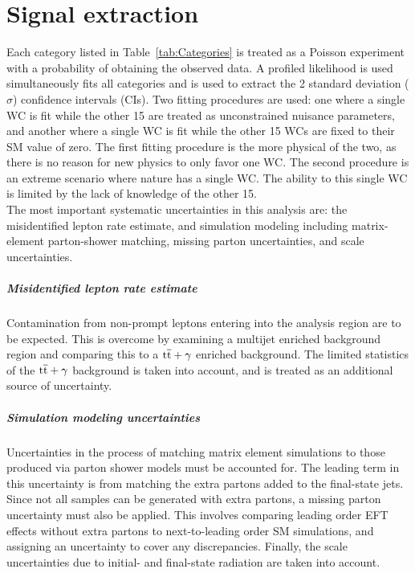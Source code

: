 \documentclass[12pt]{article}
\begin{document}
\section{Signal extraction}

Each category listed in Table~\ref{tab:Categories} is treated as a Poisson experiment with a probability of obtaining the observed data. A profiled likelihood is used simultaneously fits all categories and is used to extract the 2 standard deviation ($\sigma$) confidence intervals (CIs). Two fitting procedures are used: one where a single WC is fit while the other 15 are treated as unconstrained nuisance parameters, and another where a single WC is fit while the other 15 WCs are fixed to their SM value of zero. The first fitting procedure is the more physical of the two, as there is no reason for new physics to only favor one WC. The second procedure is an extreme scenario where nature has a single WC. The ability to this single WC is limited by the lack of knowledge of the other 15.\\

The most important systematic uncertainties in this analysis are: the misidentified lepton rate estimate, and simulation modeling including  matrix-element parton-shower matching, missing parton uncertainties, and scale uncertainties.

\subparagraph{Misidentified lepton rate estimate}

Contamination from non-prompt leptons entering into the analysis region are to be expected. This is overcome by examining a multijet enriched background region and comparing this to a $\mathrm{t\overline{t}}+\gamma$ enriched background. The limited statistics of the $\mathrm{t\overline{t}}+\gamma$ background is taken into account, and is treated as an additional source of uncertainty.

\subparagraph{Simulation modeling uncertainties}

Uncertainties in the process of matching matrix element simulations to those produced via parton shower models must be accounted for. The leading term in this uncertainty is from matching the extra partons added to the final-state jets. Since not all samples can be generated with extra partons, a missing parton uncertainty must also be applied. This involves comparing leading order EFT effects without extra partons to next-to-leading order SM simulations, and assigning an uncertainty to cover any discrepancies. Finally, the scale uncertainties due to initial- and final-state radiation are taken into account.
\end{document}
